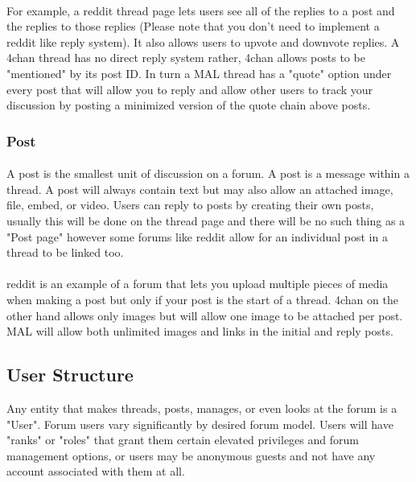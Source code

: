 \documentclass[]{article}
\begin{document}
\paragraph{}
For example, a reddit thread page lets users see all of the replies to a post and the replies to those replies (Please note that you don't need to implement a reddit like reply system). It also allows users to upvote and downvote replies. A 4chan thread has no direct reply system rather, 4chan allows posts to be "mentioned" by its post ID. In turn a MAL thread has a "quote" option under every post that will allow you to reply and allow other users to track your discussion by posting a minimized version of the quote chain above posts.    

\subsubsection{Post}\label{post}
\paragraph{}
A post is the smallest unit of discussion on a forum. A post is a message within a thread. A post will always contain text but may also allow an attached image, file, embed, or video. Users can reply to posts by creating their own posts, usually this will be done on the thread page and there will be no such thing as a "Post page" however some forums like reddit allow for an individual post in a thread to be linked too. 
\paragraph{}
reddit is an example of a forum that lets you upload multiple pieces of media when making a post but only if your post is the start of a thread. 4chan on the other hand allows only images but will allow one image to  be attached per post. MAL will allow both unlimited images and links in the initial and reply posts.

\subsection{User Structure}
Any entity that makes threads, posts, manages, or even looks at the forum is a "User". Forum users vary significantly by desired forum model. Users will have "ranks" or "roles" that grant them certain elevated privileges and forum management options, or users may be anonymous guests and not have any account associated with them at all. 
\end{document}
